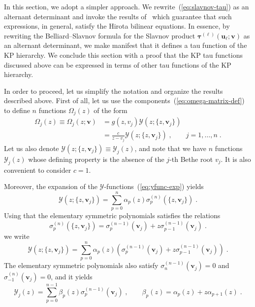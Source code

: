 \documentclass[a4paper,11pt]{amsart}
\begin{document}
In this section, we adopt a simpler approach. We
rewrite~(\ref{eq:slavnov-tau}) as an alternant determinant and invoke
the results of~\cite{Segal:1985aga, Kharchev:1991cy} which guarantee
that such expressions, in general, satisfy the Hirota bilinear
equations. In essence, by rewriting the Belliard--Slavnov formula for
the Slavnov product \(\bm{\tau}^{(\ell)}(\bm{u}_\ell; \bm{v})\) as an
alternant determinant, we make manifest that it defines a tau function
of the KP hierarchy.  We conclude this section with a proof that the
KP tau functions discussed above can be expressed in terms of other
tau functions of the KP hierarchy.

In order to proceed, let us simplify the notation and organize the
results described above. First of all, let us use the
components~(\ref{eq:omega-matrix-def}) to define \(n\) functions \(\Omega_j(z)\) of the
form
\begin{equation}
\begin{split}
\label{eq:om-def}
  \Omega_{j}(z) \equiv
  \Omega_{j}(z; \bm{v}) & = g(z, v_j) \mathcal{Y}(z; \{z, \bm{v}_j\})\\
   & = \frac{c}{z - v_j} \mathcal{Y}(z; \{z, \bm{v}_j\})\; , \qquad j =1, \dots, n \; .
\end{split}
\end{equation}
Let us also denote \(\mathcal{Y}(z; \{z, \bm{v}_j\}) \equiv
\mathcal{Y}_j(z)\), and note that we have \(n\) functions
\(\mathcal{Y}_j(z)\) whose defining property is the absence of the
\(j\)-th Bethe root \(v_j\).  It is also convenient to consider
\(c=1\).

Moreover, the expansion of the
\(\mathcal{Y}\)-functions~(\ref{eq:yfunc-exp}) yields
\begin{equation}
  \mathcal{Y}(z; \{z,\bm{v}_j\}) = \sum_{p=0}^n \alpha_p(z) \sigma_p^{(n)}(\{z,\bm{v}_j\})\; . 
\end{equation}
Using that the elementary symmetric polynomials satisfies the
relations
\begin{equation}
  \sigma_p^{(n)}(\{z,\bm{v}_j\}) = \sigma_p^{(n-1)}(\bm{v}_j) + z \sigma_{p-1}^{(n-1)}(\bm{v}_j) \; . 
\end{equation}
we write
\begin{equation}
  \label{eq:y-functions-alpha}
  \mathcal{Y}(z; \{z,\bm{v}_j\})  = 
\sum_{p=0}^{n} \alpha_p(z)
  \left(\sigma_p^{(n-1)}(\bm{v}_j) + z \sigma_{p-1}^{(n-1)}(\bm{v}_j) \right) \; .
\end{equation}
The elementary symmetric polynomials also satisfy
\(\sigma_n^{(n-1)}(\bm{v}_j)=0\) and \(\sigma_{-1}^{(n)}(\bm{v}_j)=
0\), and it yields
\begin{equation}
  \label{eq:y-functions}
  \mathcal{Y}_j(z)  = 
  \sum_{p=0}^{n-1} \beta_p(z) \sigma_p^{(n-1)}(\bm{v}_j) \; , \qquad 
\beta_p(z) = \alpha_p(z) + z \alpha_{p+1}(z) \; .
\end{equation}
\end{document}
